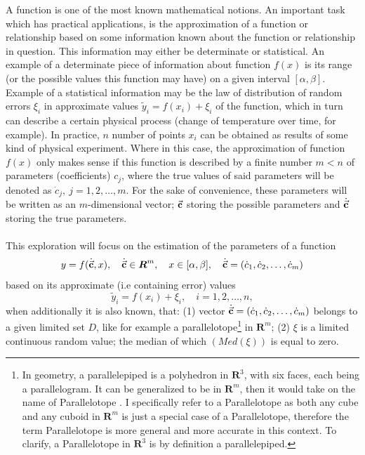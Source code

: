 A function is one of the most known mathematical notions. An important task which has practical applications, is the approximation of a function or relationship based on some information known about the function or relationship in question. This information may either be determinate or statistical. An example of a determinate piece of information about function $f(x)$ is its range (or the possible values this function may have) on a given interval $[\alpha,\beta]$. Example of a statistical information may be the law of distribution of random errors $\xi_{i}$ in approximate values $\tilde{y}_{i} = f(x_{i})+\xi_{i}$ of the function, which in turn can describe a certain physical process (change of temperature over time, for example). In practice,  $n$ number of points $x_{i}$ can be obtained as results of some kind of physical experiment. Where in this case, the approximation of function $f(x)$ only makes sense if this function is described by a finite number $m<n$ of parameters (coefficients) $c_{j}$, where the true values of said parameters will be denoted as $\dot{c}_{j}, \ j=1,2,\dots,m.$ For the sake of convenience, these parameters will be written as an $m$-dimensional vector; $\vec{\textbf{c}}$ storing the possible parameters and $\dot{\vec{\textbf{c}}}$ storing the true parameters. \\
\\
This exploration will focus on the estimation of the parameters of a function 
\begin{equation} 
y = f(\dot{\vec{\textbf{c}}},x),\quad \dot{\vec{\textbf{c}}} \in \boldsymbol{R}^{m},\quad x \in [\alpha,\beta],\quad \dot{\vec{\textbf{c}}} = (\dot{c}_{1}, \dot{c}_{2},\dots,\dot{c}_{m}) \label{301}
\end{equation}
based on its approximate (i.e containing error) values
\begin{equation}
\tilde{y}_{i} = f(x_{i})+\xi_{i}, \quad i=1,2,\dots,n ,
\end{equation}
when additionally it is also known, that: (1) vector $\dot{\vec{\textbf{c}}} = (\dot{c}_{1}, \dot{c}_{2},\dots,\dot{c}_{m})$ belongs to a given limited set $D$, like for example a parallelotope\footnote{In geometry, a parallelepiped is a polyhedron in $\boldsymbol{R}^3$, with six faces, each being a parallelogram. It can be generalized to be in $\boldsymbol{R}^m$, then it would take on the name of Parallelotope \cite{coxeter_1973}. I specifically refer to a Parallelotope as both any cube and any cuboid in $\boldsymbol{R}^m$ is just a special case of a Parallelotope, therefore the term Parallelotope is more general and more accurate in this context. To clarify, a Parallelotope in $\boldsymbol{R}^{3}$ is by definition a parallelepiped.} in $\boldsymbol{R}^{m}$; (2) $\xi$ is a limited continuous random value; the median of which $(Med(\xi))$ is equal to zero. \\
